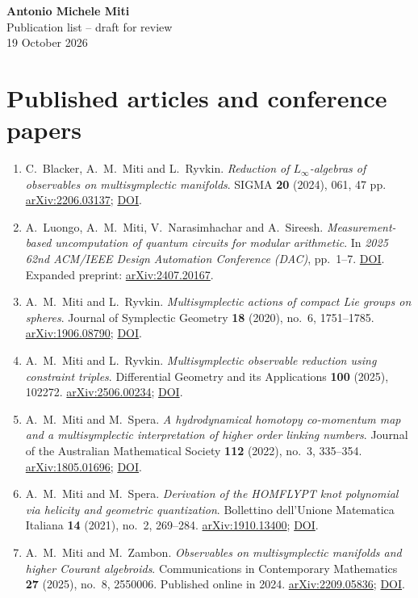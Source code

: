 \documentclass[11pt,a4paper]{article}
\begin{document}
\begin{center}{\LARGE\bfseries Antonio Michele Miti}\\[0.25em]{\Large Publication list -- draft for review}\\[0.2em]{\small 19 October 2026}\end{center}
\section*{Published articles and conference papers}
\begin{enumerate}
\item C.~Blacker, A.~M.~Miti and L.~Ryvkin. \emph{Reduction of $L_\infty$-algebras of observables on multisymplectic manifolds}. SIGMA \textbf{20} (2024), 061, 47 pp. \href{https://arxiv.org/abs/2206.03137}{arXiv:2206.03137}; \href{https://doi.org/10.3842/SIGMA.2024.061}{DOI}.
\item A.~Luongo, A.~M.~Miti, V.~Narasimhachar and A.~Sireesh. \emph{Measurement-based uncomputation of quantum circuits for modular arithmetic}. In \emph{2025 62nd ACM/IEEE Design Automation Conference (DAC)}, pp.~1--7. \href{https://doi.org/10.1109/DAC63849.2025.11132981}{DOI}. Expanded preprint: \href{https://arxiv.org/abs/2407.20167}{arXiv:2407.20167}.
\item A.~M.~Miti and L.~Ryvkin. \emph{Multisymplectic actions of compact Lie groups on spheres}. Journal of Symplectic Geometry \textbf{18} (2020), no.~6, 1751--1785. \href{https://arxiv.org/abs/1906.08790}{arXiv:1906.08790}; \href{https://doi.org/10.4310/JSG.2020.v18.n6.a6}{DOI}.
\item A.~M.~Miti and L.~Ryvkin. \emph{Multisymplectic observable reduction using constraint triples}. Differential Geometry and its Applications \textbf{100} (2025), 102272. \href{https://arxiv.org/abs/2506.00234}{arXiv:2506.00234}; \href{https://doi.org/10.1016/j.difgeo.2025.102272}{DOI}.
\item A.~M.~Miti and M.~Spera. \emph{A hydrodynamical homotopy co-momentum map and a multisymplectic interpretation of higher order linking numbers}. Journal of the Australian Mathematical Society \textbf{112} (2022), no.~3, 335--354. \href{https://arxiv.org/abs/1805.01696}{arXiv:1805.01696}; \href{https://doi.org/10.1017/S1446788720000518}{DOI}.
\item A.~M.~Miti and M.~Spera. \emph{Derivation of the HOMFLYPT knot polynomial via helicity and geometric quantization}. Bollettino dell'Unione Matematica Italiana \textbf{14} (2021), no.~2, 269--284. \href{https://arxiv.org/abs/1910.13400}{arXiv:1910.13400}; \href{https://doi.org/10.1007/s40574-020-00254-5}{DOI}.
\item A.~M.~Miti and M.~Zambon. \emph{Observables on multisymplectic manifolds and higher Courant algebroids}. Communications in Contemporary Mathematics \textbf{27} (2025), no.~8, 2550006. Published online in 2024. \href{https://arxiv.org/abs/2209.05836}{arXiv:2209.05836}; \href{https://doi.org/10.1142/S0219199725500063}{DOI}.
\end{enumerate}
\end{document}
